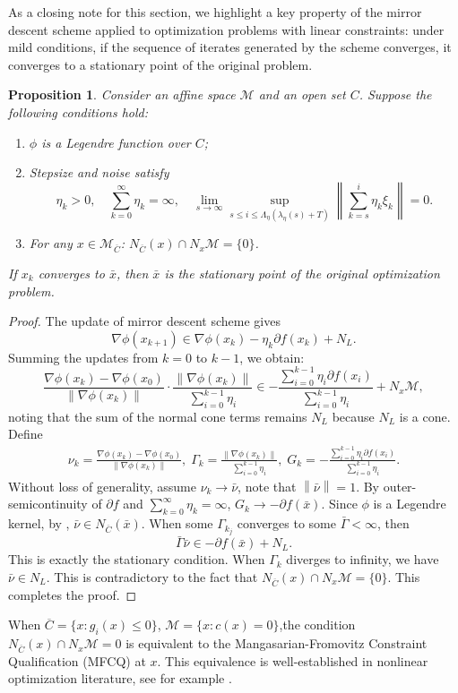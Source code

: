 \documentclass[11pt]{article}
\newcommand{\cM}{\mathcal M}
\def\norm#1{\left\|#1\right\|}
\newtheorem{proposition}{Proposition}[section]
\begin{document}
As a closing note for this section, we highlight a key property of the mirror descent scheme applied to optimization problems with linear constraints: under mild conditions, if the sequence of iterates generated by the scheme converges, it converges to a stationary point of the original problem.
\begin{proposition}
\label{prop:Breg_convergence}
Consider an affine space $\mathcal{M}$ and an open set $C$. Suppose the following conditions hold: 
\begin{enumerate}
    \item $\phi$ is a Legendre function over $C$;
    \item Stepsize and noise satisfy 
    \[        \eta_k>0,\quad\sum_{k=0}^\infty\eta_k=\infty,\quad\lim_{s\rightarrow\infty}\sup_{s\leq i\leq\Lambda_\eta(\lambda_\eta(s)+T)}\norm{\sum_{k=s}^i\eta_k\xi_k}=0.
    \]
    \item For any $x\in\cM_{\overline{C}}$: $N_{\overline{C}}(x)\cap N_x\cM=\{0\}$.
\end{enumerate}
If $x_k$ converges to $\bar x$, then $\bar x$ is the stationary point of the original optimization problem.
\end{proposition}
\begin{proof}
The update of mirror descent scheme gives
\[
\nabla\phi(x_{k+1})\in\nabla\phi(x_k)-\eta_k\partial f(x_k)+N_L.
\]
Summing the updates from $k = 0$ to $k-1$, we obtain: 
\[
\frac{\nabla\phi(x_k)-\nabla\phi(x_0)}{\norm{\nabla\phi(x_k)}}\cdot\frac{\norm{\nabla\phi(x_k)}}{\sum_{i=0}^{k-1}\eta_i}\in-\frac{\sum_{i=0}^{k-1}\eta_i\partial f(x_i)}{\sum_{i=0}^{k-1}\eta_i}+N_x\cM,
\]
noting that the sum of the normal cone terms remains $N_L$ because $N_L$ is a cone. Define 
\[
\begin{aligned}
\nu_k=\frac{\nabla\phi(x_k)-\nabla\phi(x_0)}{\norm{\nabla\phi(x_k)}},\;\Gamma_k=\frac{\norm{\nabla\phi(x_k)}}{\sum_{i=0}^{k-1}\eta_i},\;G_k=-\frac{\sum_{i=0}^{k-1}\eta_i\partial f(x_i)}{\sum_{i=0}^{k-1}\eta_i}.
\end{aligned}
\]
Without loss of generality, assume $\nu_k\to\bar\nu$, note that $\norm{\bar\nu}=1$. By outer-semicontinuity of $\partial f$ and $\sum_{k=0}^\infty\eta_k=\infty$, $G_k\to-\partial f(\bar x)$. 
Since $\phi$ is a Legendre kernel, by \cite[Lemma 4.1]{alvarez2004hessian}, $\bar\nu\in N_{\overline{C}}(\bar x)$. When some $\Gamma_{k_j}$ converges to some $\bar\Gamma<\infty$, then 
\[
\bar\Gamma\bar\nu\in-\partial f(\bar x)+N_L.
\]
This is exactly the stationary condition. When $\Gamma_k$ diverges to infinity, we have $\bar\nu\in N_L$. This is contradictory to the fact that $N_{\overline{C}}(x)\cap N_x\cM=\{0\}$. This completes the proof.
\end{proof}
When $\overline{C}=\{x:g_i(x)\leq0\}$, $\cM=\{x:c(x)=0\}$,the condition $N_{\overline{C}}(x) \cap N_x \mathcal{M} = {0}$ is equivalent to the Mangasarian-Fromovitz Constraint Qualification (MFCQ) at $x$. This equivalence is well-established in nonlinear optimization literature, see for example \cite{bertsekas1997nonlinear}.
\end{document}

